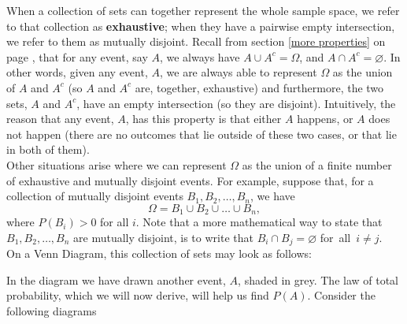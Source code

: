 \noindent When a collection of sets can together represent the whole sample space, we refer to that collection as \textbf{exhaustive}; when they have a pairwise empty intersection, we refer to them as mutually disjoint. Recall from section \ref{more properties} on page \pageref{more properties}, that for any event, say $A$, we always have $A \cup A^c = \Omega$, and $A \cap A^c = \varnothing$. In other words, given any event, $A$, we are always able to represent $\Omega$ as the union of $A$ and $A^c$ (so $A$ and $A^c$ are, together, exhaustive) and furthermore, the two sets, $A$ and $A^c$, have an empty intersection (so they are disjoint). Intuitively, the reason that any event, $A$, has this property is that either $A$ happens, or $A$ does not happen (there are no outcomes that lie outside of these two cases, or that lie in both of them).\\

\noindent Other situations arise where we can represent $\Omega$ as the union of a finite number of exhaustive and mutually disjoint events. For example, suppose that, for a collection of mutually disjoint events $B_1,B_2,\ldots,B_n$, we have
\[
\Omega = B_1 \cup B_2 \cup \ldots \cup B_n,
\]
where $P(B_i) > 0$ for all $i$. Note that a more mathematical way to state that $B_1,B_2,\ldots,B_n$ are mutually disjoint, is to write that $B_i \cap B_j = \varnothing$ for~all~$i \neq j$. \\
On a Venn Diagram, this collection of sets may look as follows:
	\begin{center}
	\end{center}

\noindent

\noindent In the diagram we have drawn another event, $A$, shaded in grey. The law of total probability, which we will now derive, will help us find $P(A)$. Consider the following diagrams

